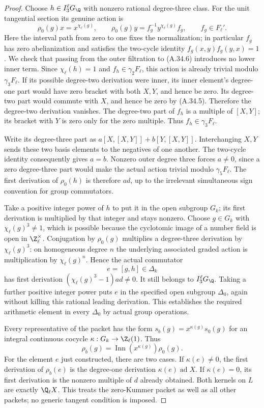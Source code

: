 \begin{proof}
Choose $h\in I_3^\ell G_\Q$ with nonzero rational degree-three
class. For the unit tangential section its genuine action is
\[
 \rho_0(g)x=x^{\chi_\ell(g)},\qquad
 \rho_0(g)y=f_g^{-1}y^{\chi_\ell(g)}f_g,
                  \qquad f_g\in F_\ell'.             \tag{A.34.6}
\]
Here the interval path from zero to one fixes the normalization;
in particular $f_g$ has zero abelianization and satisfies the
two-cycle identity $f_g(x,y)f_g(y,x)=1$.
We check that passing from the outer filtration to (A.34.6)
introduces no lower inner term. Since $\chi_\ell(h)=1$ and
$f_h\in\gamma_2F_\ell$, this action is already trivial modulo
$\gamma_3F_\ell$. If its possible degree-two derivation were
inner, its inner element's degree-one part would have zero
bracket with both $X,Y$, and hence be zero. Its degree-two
part would commute with $X$, and hence be zero by (A.34.5).
Therefore the degree-two derivation vanishes. The degree-two
part of $f_h$ is a multiple of $[X,Y]$; its bracket with $Y$
is zero only for the zero multiple. Thus
$f_h\in\gamma_3F_\ell$.

Write its degree-three part as
$a[X,[X,Y]]+b[Y,[X,Y]]$. Interchanging $X,Y$ sends these two
basis elements to the negatives of one another. The two-cycle
identity consequently gives $a=b$. Nonzero outer degree three
forces $a\ne0$, since a zero degree-three part would make the
actual action trivial modulo $\gamma_5F_\ell$. The first
derivation of $\rho_0(h)$ is therefore $a d$, up to the
irrelevant simultaneous sign convention for group commutators.

Take a positive integer power of $h$ to put it in the open
subgroup $G_k$; its first derivation is multiplied by that
integer and stays nonzero. Choose $g\in G_k$ with
$\chi_\ell(g)^3\ne1$, which is possible because the cyclotomic
image of a number field is open in $\Z_\ell^\times$. Conjugation
by $\rho_0(g)$ multiplies a degree-three derivation by
$\chi_\ell(g)^3$: on homogeneous degree $n$ the underlying
associated graded action is multiplication by
$\chi_\ell(g)^n$. Hence the actual commutator
\[
                         e=[g,h]\in\Delta_k
\]
has first derivation
$(\chi_\ell(g)^3-1)a d\ne0$. It still belongs to
$I_3^\ell G_\Q$. Taking a further positive integer power puts
$e$ in the specified open subgroup $\Delta_0$, again without
killing this rational leading derivation. This establishes
the required arithmetic element in every $\Delta_0$ by actual
group operations.

Every representative of the packet has the form
$s_b(g)=x^{\kappa(g)}s_0(g)$ for an integral continuous
cocycle $\kappa:G_k\to\Z_\ell(1)$. Thus
\[
                 \rho_b(g)=\operatorname{Inn}(x^{\kappa(g)})
                                  \rho_0(g).          \tag{A.34.7}
\]
For the element $e$ just constructed, there are two cases.
If $\kappa(e)\ne0$, the first derivation of $\rho_b(e)$ is
the degree-one derivation $\kappa(e)\operatorname{ad}X$.
If $\kappa(e)=0$, its first derivation is the nonzero multiple
of $d$ already obtained. Both kernels on $L$ are exactly
$\Q_\ell X$. This treats the zero-Kummer packet as well as all
other packets; no generic tangent condition is imposed.


\end{proof}
